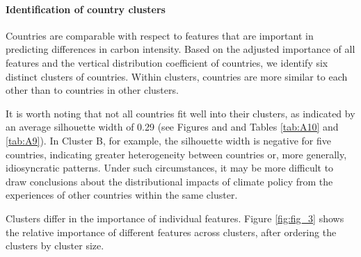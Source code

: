 \documentclass[12pt, a4paper]{article}
\begin{document}
\clearpage

\paragraph{Identification of country clusters}

Countries are comparable with respect to features that are important in predicting differences in carbon intensity. Based on the adjusted importance of all features and the vertical distribution coefficient of countries, we identify six distinct clusters of countries. Within clusters, countries are more similar to each other than to countries in other clusters. 

It is worth noting that not all countries fit well into their clusters, as indicated by an average silhouette width of 0.29 (see Figures  and  and Tables \ref{tab:A10} and \ref{tab:A9}). In Cluster B, for example, the silhouette width is negative for five countries, indicating greater heterogeneity between countries or, more generally, idiosyncratic patterns. Under such circumstances, it may be more difficult to draw conclusions about the distributional impacts of climate policy from the experiences of other countries within the same cluster. 

Clusters differ in the importance of individual features. Figure \ref{fig:fig_3} shows the relative importance of different features across clusters, after ordering the clusters by cluster size. 
\end{document}
